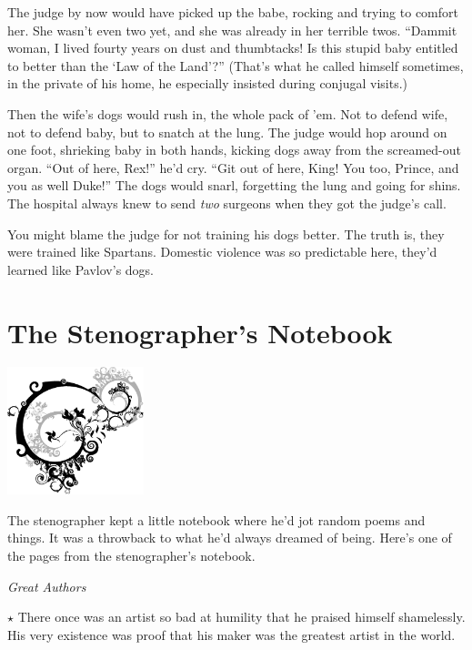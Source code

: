 \documentclass[oneside]{book}
\begin{document}
The judge by now would have picked up the babe,
rocking and trying to comfort her.  She wasn't even two yet, and she
was already in her terrible twos.  ``Dammit woman, I lived
fourty years on dust and thumbtacks!  Is this stupid baby entitled
to better than the `Law of the Land'?''
(That's what he called himself sometimes, in the private of his home,
he especially insisted during conjugal visits.)

Then the wife's dogs would rush in, the whole pack of 'em.  Not to defend
wife, not to defend baby, but to snatch at the lung.  The judge would hop around
on one foot, shrieking baby in both hands,
kicking dogs away from the screamed-out organ.
``Out of here, Rex!'' he'd cry.  ``Git out of here, King!
You too, Prince, and you as well Duke!''  The dogs would snarl, forgetting the
lung and going for shins.  The hospital always knew to send \emph{two}
surgeons when they got the judge's call.

You might blame the judge for not training his dogs better.
The truth is, they were trained like Spartans.
Domestic violence was so predictable here, they'd learned like Pavlov's dogs.

\chapter{The Stenographer's Notebook}

\vspace{-3in}
\hspace{-1.5in}
\includegraphics[width=150px]{ulcornerstenotebook.eps}
\vspace{1in}

The stenographer kept a little notebook where he'd jot random
poems and things.  It was a throwback to what he'd always dreamed
of being.  Here's one of the pages from the stenographer's notebook.

\vspace{2mm}
\noindent \textit{Great Authors}

$\star$ There once was an artist so bad at humility that he praised himself
shamelessly.  His very existence was proof that his maker was the greatest
artist in the world.
\end{document}
